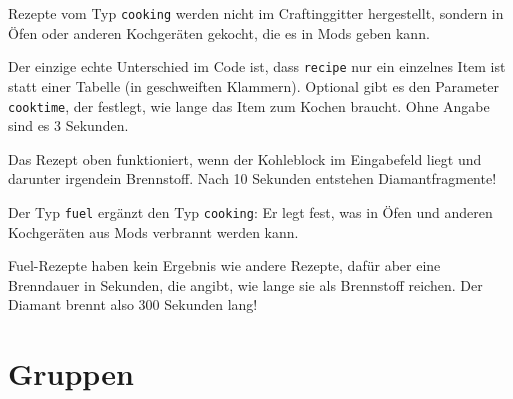 Rezepte vom Typ \texttt{cooking} werden nicht im Craftinggitter
hergestellt, sondern in Öfen oder anderen Kochgeräten gekocht, die es in
Mods geben kann.

\begin{Shaded}
\begin{Highlighting}[]
\OperatorTok{(\{}
     \OperatorTok{=} \OperatorTok{,}
     \OperatorTok{=} \OperatorTok{,}
     \OperatorTok{=} \OperatorTok{,}
     \OperatorTok{=} \OperatorTok{,}
\OperatorTok{\})}
\end{Highlighting}
\end{Shaded}

Der einzige echte Unterschied im Code ist, dass \texttt{recipe} nur ein
einzelnes Item ist statt einer Tabelle (in geschweiften Klammern).
Optional gibt es den Parameter \texttt{cooktime}, der festlegt, wie
lange das Item zum Kochen braucht. Ohne Angabe sind es 3 Sekunden.

Das Rezept oben funktioniert, wenn der Kohleblock im Eingabefeld liegt
und darunter irgendein Brennstoff. Nach 10 Sekunden entstehen
Diamantfragmente!

Der Typ \texttt{fuel} ergänzt den Typ \texttt{cooking}: Er legt fest,
was in Öfen und anderen Kochgeräten aus Mods verbrannt werden kann.

\begin{Shaded}
\begin{Highlighting}[]
\OperatorTok{(\{}
     \OperatorTok{=} \OperatorTok{,}
     \OperatorTok{=} \OperatorTok{,}
     \OperatorTok{=} \OperatorTok{,}
\OperatorTok{\})}
\end{Highlighting}
\end{Shaded}

Fuel-Rezepte haben kein Ergebnis wie andere Rezepte, dafür aber eine
Brenndauer in Sekunden, die angibt, wie lange sie als Brennstoff
reichen. Der Diamant brennt also 300 Sekunden lang!

\section{Gruppen}\label{gruppen}

